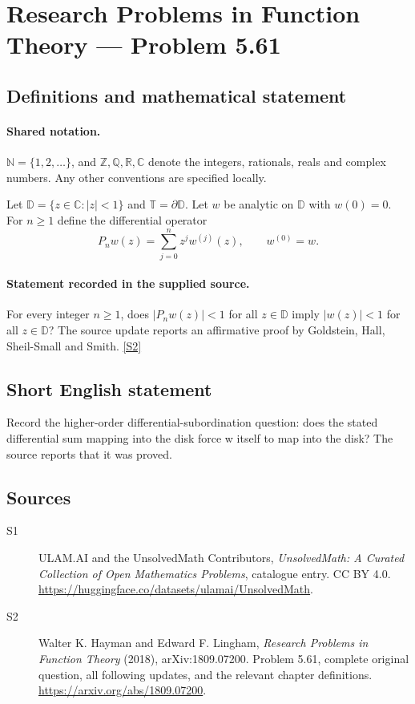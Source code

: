 \documentclass[11pt]{book}
\newcommand{\sref}[2]{\hyperlink{source:#1:#2}{[S#2]}}
\begin{document}
\section{Research Problems in Function Theory — Problem 5.61}\label{statement}

\subsection{Definitions and mathematical statement}

\paragraph{Shared notation.}$\mathbb N=\{1,2,\ldots\}$, and $\mathbb Z,\mathbb Q,\mathbb R,\mathbb C$ denote the integers, rationals, reals and complex numbers. Any other conventions are specified locally.


Let $\mathbb D=\{z\in\mathbb C:|z|<1\}$ and $\mathbb T=\partial\mathbb D$. Let $w$ be analytic on $\mathbb D$ with $w(0)=0$. For $n\ge1$ define the differential operator \[P_nw(z)=\sum_{j=0}^{n}z^jw^{(j)}(z),\qquad w^{(0)}=w.\]
\paragraph{Statement recorded in the supplied source.}
For every integer $n\ge1$, does $|P_nw(z)|<1$ for all $z\in\mathbb D$ imply $|w(z)|<1$ for all $z\in\mathbb D$? The source update reports an affirmative proof by Goldstein, Hall, Sheil-Small and Smith. \sref{statement}{2}
\subsection{Short English statement}
Record the higher-order differential-subordination question: does the stated differential sum mapping into the disk force w itself to map into the disk? The source reports that it was proved.
\subsection{Sources}
\begin{description}
\item[\hypertarget{source:statement:1}{S1}] ULAM.AI and the UnsolvedMath Contributors, \emph{UnsolvedMath: A Curated Collection of Open Mathematics Problems}, catalogue entry. CC BY 4.0. \url{https://huggingface.co/datasets/ulamai/UnsolvedMath}.
\item[\hypertarget{source:statement:2}{S2}] Walter K. Hayman and Edward F. Lingham, \emph{Research Problems in Function Theory} (2018), arXiv:1809.07200. Problem 5.61, complete original question, all following updates, and the relevant chapter definitions. \url{https://arxiv.org/abs/1809.07200}.
\end{description}
\label{end:statement}
\end{document}
